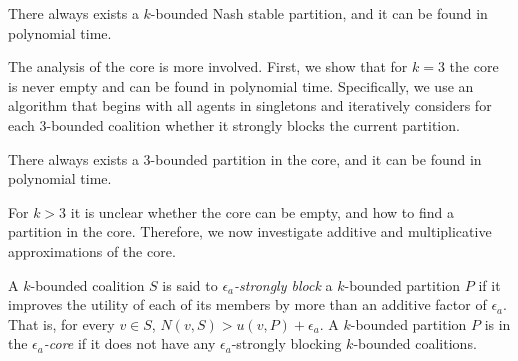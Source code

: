 \documentclass[sigconf]{aamas}
\begin{document}
\begin{theorem}
There always exists a $k$-bounded Nash stable partition, and it can be found in polynomial time.
\end{theorem}





The analysis of the core is more involved.
First, we show that for $k=3$ the core is never empty and can be found in polynomial time. Specifically, we use an algorithm that begins with all agents in singletons and iteratively considers for each $3$-bounded coalition whether it strongly blocks the current partition.

\begin{theorem}
There always exists a $3$-bounded partition in the core, and it can be found in polynomial time.
\end{theorem}


For $k>3$ it is unclear whether the core can be empty, and how to find a partition in the core. Therefore, we now investigate additive and multiplicative approximations of the core. %
%
\begin{definition}
A $k$-bounded coalition $S$ is said to \emph{$\epsilon_a$-strongly block} a $k$-bounded partition $P$ if it improves the utility of each of its members by more than an additive factor of $\epsilon_a$. That is, for every $v \in S$, $N(v,S) > u(v,P) + \epsilon_a$.
A $k$-bounded partition $P$ is in the \emph{$\epsilon_a$-core} if it does not have any $\epsilon_a$-strongly blocking $k$-bounded coalitions.
\end{definition}
\end{document}
